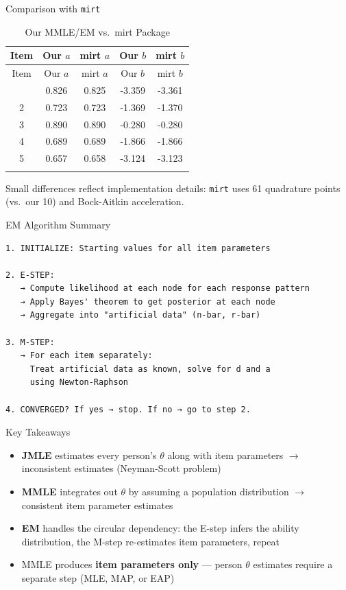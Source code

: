 \documentclass[
  ignorenonframetext,
]{beamer}
\begin{document}
\begin{frame}[fragile]{Comparison with \texttt{mirt}}
\label{comparison-with-mirt}
\begin{longtable}[]{@{}ccccc@{}}
\caption{Our MMLE/EM vs.~mirt Package}\tabularnewline
\toprule\noalign{}
Item & Our \(a\) & mirt \(a\) & Our \(b\) & mirt \(b\) \\
\midrule\noalign{}
\endfirsthead
\toprule\noalign{}
Item & Our \(a\) & mirt \(a\) & Our \(b\) & mirt \(b\) \\
\midrule\noalign{}
\endhead
1 & 0.826 & 0.825 & -3.359 & -3.361 \\
2 & 0.723 & 0.723 & -1.369 & -1.370 \\
3 & 0.890 & 0.890 & -0.280 & -0.280 \\
4 & 0.689 & 0.689 & -1.866 & -1.866 \\
5 & 0.657 & 0.658 & -3.124 & -3.123 \\
\bottomrule\noalign{}
\end{longtable}

Small differences reflect implementation details: \texttt{mirt} uses 61
quadrature points (vs.~our 10) and Bock-Aitkin acceleration.
\end{frame}

\begin{frame}[fragile]{EM Algorithm Summary}
\label{em-algorithm-summary}
\begin{verbatim}
1. INITIALIZE: Starting values for all item parameters

2. E-STEP:
   → Compute likelihood at each node for each response pattern
   → Apply Bayes' theorem to get posterior at each node
   → Aggregate into "artificial data" (n-bar, r-bar)

3. M-STEP:
   → For each item separately:
     Treat artificial data as known, solve for d and a
     using Newton-Raphson

4. CONVERGED? If yes → stop. If no → go to step 2.
\end{verbatim}
\end{frame}

\begin{frame}{Key Takeaways}
\label{key-takeaways}
\begin{itemize}
\item
  \textbf{JMLE} estimates every person's \(\theta\) along with item
  parameters \(\rightarrow\) inconsistent estimates (Neyman-Scott
  problem)
\item
  \textbf{MMLE} integrates out \(\theta\) by assuming a population
  distribution \(\rightarrow\) consistent item parameter estimates
\item
  \textbf{EM} handles the circular dependency: the E-step infers the
  ability distribution, the M-step re-estimates item parameters, repeat
\item
  MMLE produces \textbf{item parameters only} --- person \(\theta\)
  estimates require a separate step (MLE, MAP, or EAP)
\end{itemize}
\end{frame}
\end{document}
